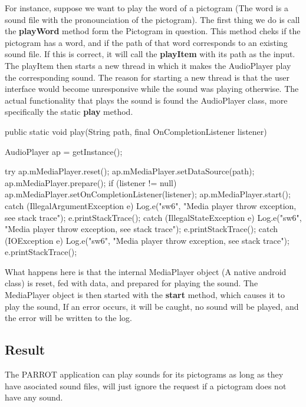 For instance, suppose we want to play the word of a pictogram (The word is a sound file with the pronounciation of the pictogram). 
The first thing we do is call the \textbf{playWord} method form the Pictogram in question. 
This method cheks if the pictogram has a word, and if the path of that word corresponds to an existing sound file. 
If this is correct, it will call the \textbf{playItem} with its path as the input. 
The playItem then starts a new thread in which it makes the AudioPlayer play the corresponding sound. 
The reason for starting a new thread is that the user interface would become unresponsive while the sound was playing otherwise.\newline
The actual functionality that plays the sound is found the AudioPlayer class, more specifically the static \textbf{play} method.\newline

\begin{source}{}
	public static void play(String path, final OnCompletionListener listener)
	{
		AudioPlayer ap = getInstance();
		 
		try {
			ap.mMediaPlayer.reset();
			ap.mMediaPlayer.setDataSource(path);
			ap.mMediaPlayer.prepare();
			if (listener != null)
				ap.mMediaPlayer.setOnCompletionListener(listener);
			ap.mMediaPlayer.start(); 
		} catch (IllegalArgumentException e) {
			Log.e("sw6", "Media player throw exception, see stack trace");
			e.printStackTrace();
		} catch (IllegalStateException e) {
			Log.e("sw6", "Media player throw exception, see stack trace");
			e.printStackTrace();
		} catch (IOException e) {
			Log.e("sw6", "Media player throw exception, see stack trace");
			e.printStackTrace();
		} 
	}
\end{source}

What happens here is that the internal MediaPlayer object (A native android class) is reset, fed with data, and prepared for playing the sound. The MediaPlayer object is then started with the \textbf{start} method, which causes it to play the sound, If an error occurs, it will be caught, no sound will be played, and the error will be written to the log.\newline

\subsection*{Result}
The PARROT application can play sounds for its pictograms as long as they have asociated sound files, will just ignore the request if a pictogram does not have any sound.

